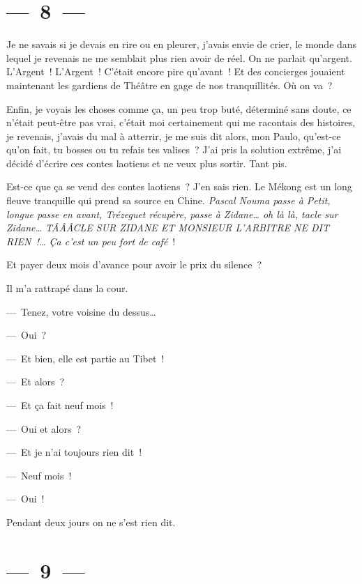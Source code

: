 \documentclass[twoside]{book} %
\begin{document}
\section[{— 8 —}]{— 8 —}
\renewcommand{\leftmark}{— 8 —}

\noindent Je ne savais si je devais en rire ou en pleurer, j’avais envie de crier, le monde dans lequel je revenais ne me semblait plus rien avoir de réel. On ne parlait qu’argent. L’Argent ! L’Argent ! C’était encore pire qu’avant ! Et des concierges jouaient maintenant les gardiens de Théâtre en gage de nos tranquillités. Où on va ?\par
Enfin, je voyais les choses comme ça, un peu trop buté, déterminé sans doute, ce n’était peut-être pas vrai, c’était moi certainement qui me racontais des histoires, je revenais, j’avais du mal à atterrir, je me suis dit alors, mon Paulo, qu’est-ce qu’on fait, tu bosses ou tu refais tes valises ? J’ai pris la solution extrême, j’ai décidé d’écrire ces contes laotiens et ne veux plus sortir. Tant pis.\par
Est-ce que ça se vend des contes laotiens ? J’en sais rien. Le Mékong est un long fleuve tranquille qui prend sa source en Chine. \emph{Pascal Nouma passe à Petit, longue passe en avant, Trézeguet récupère, passe à Zidane… oh là là, tacle sur Zidane… TÂÂÂCLE SUR ZIDANE ET MONSIEUR L’ARBITRE NE DIT RIEN !… Ça c’est un peu fort de café} !\par
Et payer deux mois d’avance pour avoir le prix du silence ?\par
Il m’a rattrapé dans la cour.\par
— Tenez, votre voisine du dessus…\par
— Oui ?\par
— Et bien, elle est partie au Tibet !\par
— Et alors ?\par
— Et ça fait neuf mois !\par
— Oui et alors ?\par
— Et je n’ai toujours rien dit !\par
— Neuf mois !\par
— Oui !\par
Pendant deux jours on ne s’est rien dit.

\section[{— 9 —}]{— 9 —}
\renewcommand{\leftmark}{— 9 —}
\end{document}
